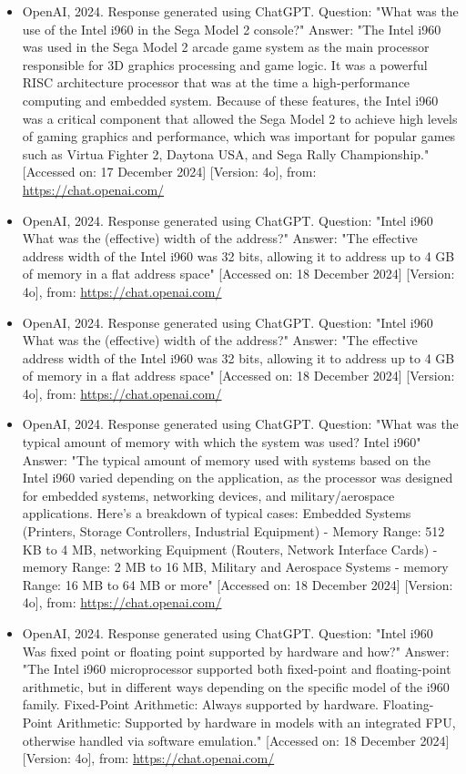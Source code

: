 \documentclass{article}
\begin{document}
\begin{itemize}
\item OpenAI, 2024. Response generated using ChatGPT. Question: "What was the use of the Intel i960 in the Sega Model 2 console?" Answer: "The Intel i960 was used in the Sega Model 2 arcade game system as the main processor responsible for 3D graphics processing and game logic. It was a powerful RISC architecture processor that was at the time a high-performance computing and embedded system. Because of these features, the Intel i960 was a critical component that allowed the Sega Model 2 to achieve high levels of gaming graphics and performance, which was important for popular games such as Virtua Fighter 2, Daytona USA, and Sega Rally Championship." [Accessed on: 17 December 2024] [Version: 4o], from: \url{https://chat.openai.com/}

\item OpenAI, 2024. Response generated using ChatGPT. Question: "Intel i960 What was  the (effective) width of the address?" Answer: "The effective address width of the Intel i960 was 32 bits, allowing it to address up to 4 GB of memory in a flat address space" [Accessed on: 18 December 2024] [Version: 4o], from: \url{https://chat.openai.com/}

\item OpenAI, 2024. Response generated using ChatGPT. Question: "Intel i960 What was  the (effective) width of the address?" Answer: "The effective address width of the Intel i960 was 32 bits, allowing it to address up to 4 GB of memory in a flat address space" [Accessed on: 18 December 2024] [Version: 4o], from: \url{https://chat.openai.com/}

\item OpenAI, 2024. Response generated using ChatGPT. Question: "What was the typical amount of memory with which the system was used? Intel i960" Answer: "The typical amount of memory used with systems based on the Intel i960 varied depending on the application, as the processor was designed for embedded systems, networking devices, and military/aerospace applications. Here’s a breakdown of typical cases: Embedded Systems (Printers, Storage Controllers, Industrial Equipment) - Memory Range: 512 KB to 4 MB, networking Equipment (Routers, Network Interface Cards) - memory Range: 2 MB to 16 MB, Military and Aerospace Systems - memory Range: 16 MB to 64 MB or more" [Accessed on: 18 December 2024] [Version: 4o], from: \url{https://chat.openai.com/}

\item OpenAI, 2024. Response generated using ChatGPT. Question: "Intel i960 Was fixed point or floating point supported by hardware and how?" Answer: "The Intel i960 microprocessor supported both fixed-point and floating-point arithmetic, but in different ways depending on the specific model of the i960 family. Fixed-Point Arithmetic: Always supported by hardware. Floating-Point Arithmetic: Supported by hardware in models with an integrated FPU, otherwise handled via software emulation." [Accessed on: 18 December 2024] [Version: 4o], from: \url{https://chat.openai.com/}

\end{itemize}
\end{document}
